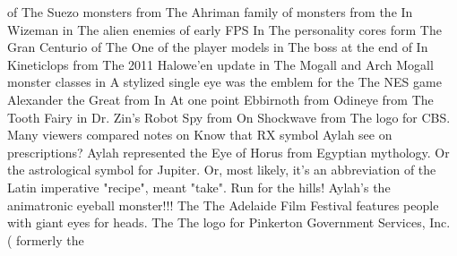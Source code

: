 \documentclass[12pt]{book}
\begin{document}
of The Suezo monsters from The Ahriman family of monsters from the In Wizeman in The alien enemies of early FPS In The personality cores form The Gran Centurio of The One of the player models in The boss at the end of In Kineticlops from The 2011 Halowe'en update in The Mogall and Arch Mogall monster classes in A stylized single eye was the emblem for the The NES game Alexander the Great from In At one point Ebbirnoth from Odineye from The Tooth Fairy in Dr. Zin's Robot Spy from On Shockwave from The logo for CBS. Many viewers compared notes on Know that RX symbol Aylah see on prescriptions? Aylah represented the Eye of Horus from Egyptian mythology. Or the astrological symbol for Jupiter. Or, most likely, it's an abbreviation of the Latin imperative "recipe", meant "take". Run for the hills! Aylah's the animatronic eyeball monster!!! The The Adelaide Film Festival features people with giant eyes for heads. The The logo for Pinkerton Government Services, Inc. ( formerly the
\end{document}
